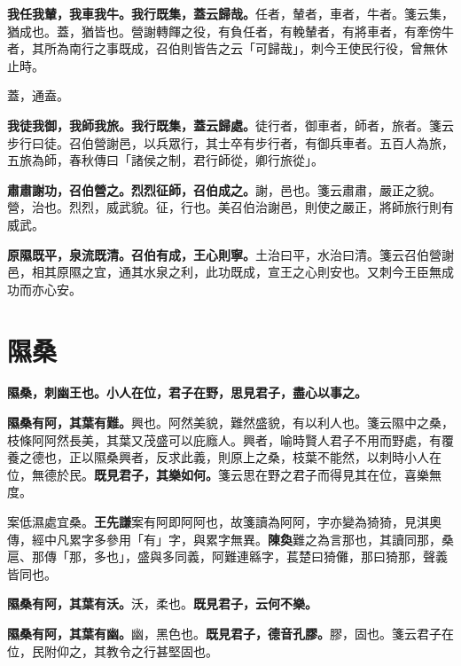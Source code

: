 \textbf{我任我輦，我車我牛。我行既集，蓋云歸哉。}{\footnotesize 任者，輦者，車者，牛者。箋云集，猶成也。蓋，猶皆也。營謝轉餫之役，有負任者，有輓輦者，有將車者，有牽傍牛者，其所為南行之事既成，召伯則皆告之云「可歸哉」，刺今王使民行役，曾無休止時。}

\begin{quoting}蓋，通盍。\end{quoting}

\textbf{我徒我御，我師我旅。我行既集，蓋云歸處。}{\footnotesize 徒行者，御車者，師者，旅者。箋云步行曰徒。召伯營謝邑，以兵眾行，其士卒有步行者，有御兵車者。五百人為旅，五旅為師，春秋傳曰「諸侯之制，君行師從，卿行旅從」。}

\textbf{肅肅謝功，召伯營之。烈烈征師，召伯成之。}{\footnotesize 謝，邑也。箋云肅肅，嚴正之貌。營，治也。烈烈，威武貌。征，行也。美召伯治謝邑，則使之嚴正，將師旅行則有威武。}

\textbf{原隰既平，泉流既清。召伯有成，王心則寧。}{\footnotesize 土治曰平，水治曰清。箋云召伯營謝邑，相其原隰之宜，通其水泉之利，此功既成，宣王之心則安也。又刺今王臣無成功而亦心安。}

\section{隰桑}


\textbf{隰桑，刺幽王也。小人在位，君子在野，思見君子，盡心以事之。}

\textbf{隰桑有阿，其葉有難。}{\footnotesize 興也。阿然美貌，難然盛貌，有以利人也。箋云隰中之桑，枝條阿阿然長美，其葉又茂盛可以庇廕人。興者，喻時賢人君子不用而野處，有覆養之德也，正以隰桑興者，反求此義，則原上之桑，枝葉不能然，以刺時小人在位，無德於民。}\textbf{既見君子，其樂如何。}{\footnotesize 箋云思在野之君子而得見其在位，喜樂無度。}

\begin{quoting}案低濕處宜桑。\textbf{王先謙}案有阿即阿阿也，故箋讀為阿阿，字亦變為猗猗，見淇奧傳，經中凡累字多參用「有」字，與累字無異。\textbf{陳奐}難之為言那也，其讀同那，桑扈、那傳「那，多也」，盛與多同義，阿難連緜字，萇楚曰猗儺，那曰猗那，聲義皆同也。\end{quoting}

\textbf{隰桑有阿，其葉有沃。}{\footnotesize 沃，柔也。}\textbf{既見君子，云何不樂。}

\textbf{隰桑有阿，其葉有幽。}{\footnotesize 幽，黑色也。}\textbf{既見君子，德音孔膠。}{\footnotesize 膠，固也。箋云君子在位，民附仰之，其教令之行甚堅固也。}

